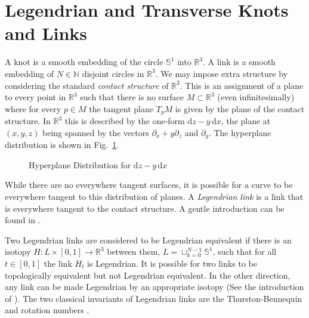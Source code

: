 \documentclass{article}
\theoremstyle{plain}
\begin{document}
    \section{Legendrian and Transverse Knots and Links}
        A knot is a smooth embedding of the circle $\mathbb{S}^{1}$ into
        $\mathbb{R}^{3}$. A link is a smooth embedding of $N\in\mathbb{N}$
        disjoint circles in $\mathbb{R}^{3}$. We may impose
        extra structure by considering the standard \textit{contact structure}
        of $\mathbb{R}^{3}$. This is an assignment
        of a plane to every point in $\mathbb{R}^{3}$ such that there is no
        surface $M\subset\mathbb{R}^{3}$ (even infinitesimally) where for every
        $p\in{M}$ the tangent
        plane $T_{p}M$ is given by the plane of the contact structure. In
        $\mathbb{R}^{3}$ this is described by the one-form
        $\textrm{d}z-y\,\textrm{d}x$, the plane at $(x,y,z)$ being spanned by
        the vectors $\partial_{x}+y\partial_{z}$ and $\partial_{y}$. The
        hyperplane distribution is shown in Fig.~\ref{fig:darboux_form_001}.
        \begin{figure}
            \centering
            \caption{Hyperplane Distribution for $\textrm{d}z-y\,\textrm{d}x$}
            \label{fig:darboux_form_001}
        \end{figure}
        While there are no everywhere tangent surfaces, it is possible for a
        curve to be everywhere tangent to this distribution of planes.
        A \textit{Legendrian link} is a link that is everywhere tangent to
        the contact structure. A gentle introduction can be found
        in \cite{JoshuaMSabloffWhatIsLegendrianKnot}.
        \par\hfill\par
        Two Legendrian links are considered to be Legendrian equivalent if
        there is an isotopy $H:L\times[0,1]\rightarrow\mathbb{R}^{3}$ between
        them, $L=\sqcup_{k=0}^{N-1}\mathbb{S}^{1}$, such that for all
        $t\in[0,1]$ the link $H_{t}$ is Legendrian. It is possible for two links
        to be topologically equivalent but not Legendrian equivalent. In the other
        direction, any link can be made Legendrian by an appropriate isotopy
        (See the introduction of \cite{VeraVertessiTransNonSimpleKnots}). The
        two classical invariants of Legendrian links are the Thurston-Bennequin
        and rotation numbers \cite{Ding2006LEGENDRIANHA}.
\end{document}
